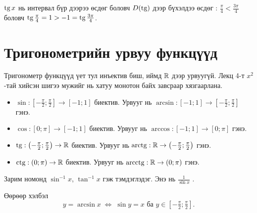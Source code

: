 \begin{remark}
$\operatorname{tg} x$ нь интервал бүр дээрээ өсдөг боловч $D(\operatorname{tg})$ дээр бүхэлдээ өсдөг :
$\frac{\pi}{4}<\frac{3\pi}{4}$ боловч $\operatorname{tg}\frac{\pi}{4}=1>-1=\operatorname{tg}\frac{3\pi}{4}$.
\end{remark}

\section{Тригонометрийн урвуу функцүүд}
Тригонометр функцүүд үет тул инъектив биш, иймд $\mathbb{R}$ дээр урвуугүй. Лекц 4-т
$x^2$-тай хийсэн шигээ мужийг нь хатуу монотон байх завсраар хязгаарлана.

\begin{definition}
\leavevmode
\begin{itemize}
  \item $\sin:\left[-\frac{\pi}{2};\frac{\pi}{2}\right]\to[-1;1]$ биектив. Урвууг нь
        $\arcsin:[-1;1]\to\left[-\frac{\pi}{2};\frac{\pi}{2}\right]$ гэнэ.
  \item $\cos:[0;\pi]\to[-1;1]$ биектив. Урвууг нь
        $\arccos:[-1;1]\to[0;\pi]$ гэнэ.
  \item $\operatorname{tg}:\left(-\frac{\pi}{2};\frac{\pi}{2}\right)\to\mathbb{R}$ биектив. Урвууг нь
        $\operatorname{arctg}:\mathbb{R}\to\left(-\frac{\pi}{2};\frac{\pi}{2}\right)$ гэнэ.
  \item $\operatorname{ctg}:(0;\pi)\to\mathbb{R}$ биектив. Урвууг нь
        $\operatorname{arcctg}:\mathbb{R}\to(0;\pi)$ гэнэ.
\end{itemize}
Зарим номонд $\sin^{-1}x$, $\tan^{-1}x$ гэж тэмдэглэдэг. Энэ нь $\frac{1}{\sin x}$ .
\end{definition}

Өөрөөр хэлбэл
\[
y=\arcsin x \;\Longleftrightarrow\; \sin y=x \text{ ба } y\in\left[-\tfrac{\pi}{2};\tfrac{\pi}{2}\right].
\]

